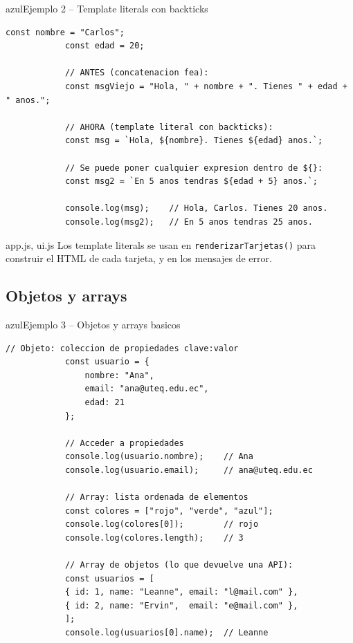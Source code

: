 \documentclass[11pt,a4paper]{article}
\begin{document}
	\begin{cajacodigo}{azul}{Ejemplo 2 -- Template literals con backticks}
		\begin{lstlisting}[style=codejs]
			const nombre = "Carlos";
			const edad = 20;
			
			// ANTES (concatenacion fea):
			const msgViejo = "Hola, " + nombre + ". Tienes " + edad + " anos.";
			
			// AHORA (template literal con backticks):
			const msg = `Hola, ${nombre}. Tienes ${edad} anos.`;
			
			// Se puede poner cualquier expresion dentro de ${}:
			const msg2 = `En 5 anos tendras ${edad + 5} anos.`;
			
			console.log(msg);    // Hola, Carlos. Tienes 20 anos.
			console.log(msg2);   // En 5 anos tendras 25 anos.
		\end{lstlisting}
	\end{cajacodigo}
	
	\begin{cajapractica}{app.js, ui.js}
		Los template literals se usan en \texttt{renderizarTarjetas()} para construir el HTML de cada tarjeta, y en los mensajes de error.
	\end{cajapractica}
	
	\subsection{Objetos y arrays}
	
	\begin{cajacodigo}{azul}{Ejemplo 3 -- Objetos y arrays basicos}
		\begin{lstlisting}[style=codejs]
			// Objeto: coleccion de propiedades clave:valor
			const usuario = {
				nombre: "Ana",
				email: "ana@uteq.edu.ec",
				edad: 21
			};
			
			// Acceder a propiedades
			console.log(usuario.nombre);    // Ana
			console.log(usuario.email);     // ana@uteq.edu.ec
			
			// Array: lista ordenada de elementos
			const colores = ["rojo", "verde", "azul"];
			console.log(colores[0]);        // rojo
			console.log(colores.length);    // 3
			
			// Array de objetos (lo que devuelve una API):
			const usuarios = [
			{ id: 1, name: "Leanne", email: "l@mail.com" },
			{ id: 2, name: "Ervin",  email: "e@mail.com" },
			];
			console.log(usuarios[0].name);  // Leanne
		\end{lstlisting}
	\end{cajacodigo}
	
\end{document}
